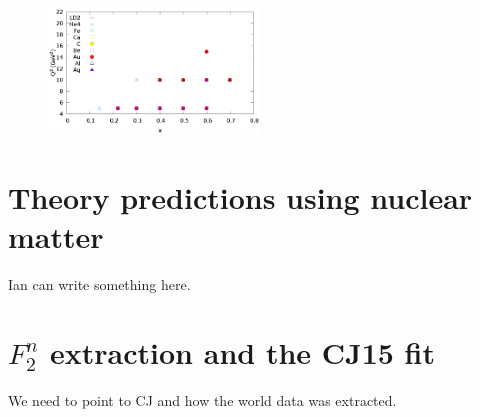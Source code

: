 \documentclass[oneside]{article}
\begin{document}
\begin{figure}[H]
  \centering
      	  \includegraphics[width=0.5\textwidth]{plots/F2ADdataQ2vsx.eps}
 	 \caption[]{}
  \label{fig:slac_q2x}
 \end{figure} 
 
\section{Theory predictions using nuclear matter}

Ian can write something here.
  
\section{$F_2^n$ extraction and the CJ15 fit}

We need to point to CJ and how the world data was extracted. 
\end{document}
